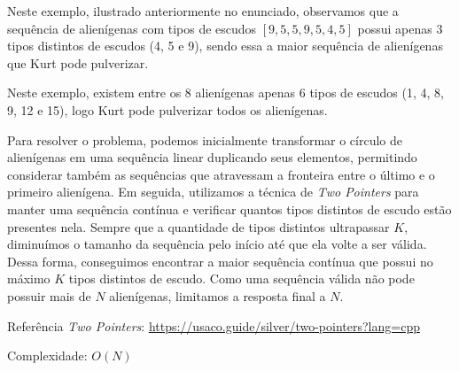 Neste exemplo, ilustrado anteriormente no enunciado, observamos que a sequência de alienígenas com tipos de escudos $[9,5,5,9,5,4,5]$ possui apenas 3 tipos distintos de escudos (4, 5 e 9), sendo essa a maior sequência de alienígenas que Kurt pode pulverizar.

Neste exemplo, existem entre os 8 alienígenas apenas 6 tipos de escudos (1, 4, 8, 9, 12 e 15), logo Kurt pode pulverizar todos os alienígenas.

Para resolver o problema, podemos inicialmente transformar o círculo de alienígenas em uma sequência linear duplicando seus elementos, permitindo considerar também as sequências que atravessam a fronteira entre o último e o primeiro alienígena. Em seguida, utilizamos a técnica de \textit{Two Pointers}
para manter uma sequência contínua e verificar quantos tipos distintos de escudo estão presentes nela. Sempre que a quantidade de tipos distintos ultrapassar $K$, diminuímos o tamanho da sequência pelo início até que ela volte a ser válida. Dessa forma, conseguimos encontrar a maior sequência contínua que possui no máximo $K$ tipos distintos de escudo. Como uma sequência válida não pode possuir mais de $N$ alienígenas, limitamos a resposta final a $N$.

Referência \textit{Two Pointers}: \url{https://usaco.guide/silver/two-pointers?lang=cpp}

Complexidade: $O(N)$
